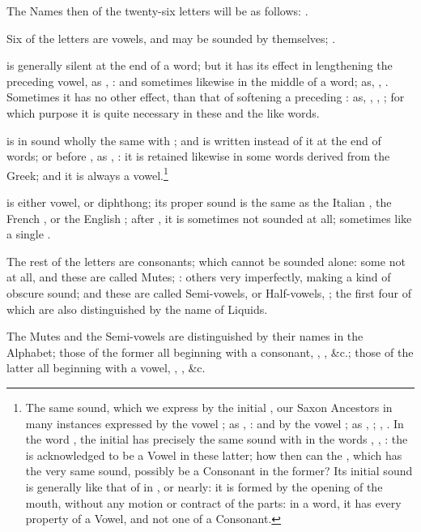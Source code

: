 The Names then of the twenty-six letters will be as follows: .

Six of the letters are vowels, and may be sounded by themselves; .

 is generally silent at the end of a word; but it has its effect
in lengthening the preceding vowel, as , : and
sometimes likewise in the middle of a word; as, ,
. Sometimes it has no other effect, than that of
softening a preceding : as, , ,
; for which purpose it is quite necessary in these and the
like words.

 is in sound wholly the same with ; and is written instead
of it at the end of words; or before , as ,
: it is retained likewise in some words derived from the
Greek; and it is always a vowel.\footnote{The same sound, which we
  express by the initial , our Saxon Ancestors in many instances
  expressed by the vowel ; as , : and by the
  vowel ; as , ; , . In the word
  , the initial  has precisely the same sound with 
  in the words , , : the  is
  acknowledged to be a Vowel in these latter; how then can the ,
  which has the very same sound, possibly be a Consonant in the former?
  Its initial sound is generally like that of  in , or
   nearly: it is formed by the opening of the mouth, without any
  motion or contract of the parts: in a word, it has every property of a
  Vowel, and not one of a Consonant.}

 is either vowel, or diphthong; its proper sound is the same as
the Italian , the French , or the English ; after
, it is sometimes not sounded at all; sometimes like a single
.

The rest of the letters are consonants; which cannot be sounded alone:
some not at all, and these are called Mutes; : others very imperfectly, making a kind of obscure sound; and these
are called Semi-vowels, or Half-vowels, ; the first
four of which are also distinguished by the name of Liquids.

The Mutes and the Semi-vowels are distinguished by their names in the
Alphabet; those of the former all beginning with a consonant, ,
, \&c.; those of the latter all beginning with a vowel, ,
, \&c.

